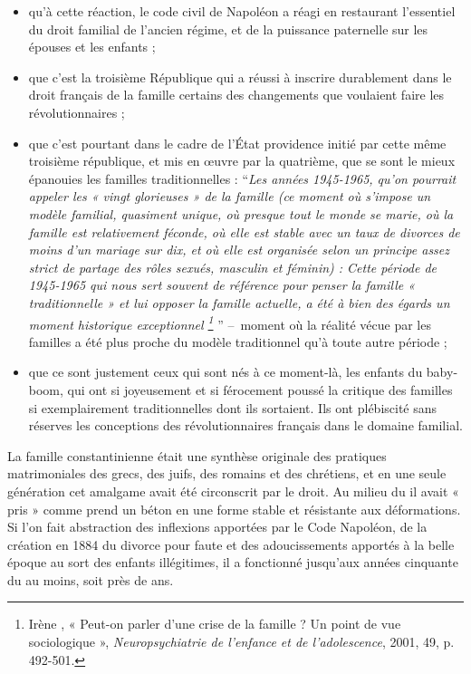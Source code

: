 \begin{itemize}
\item qu'à cette réaction, le code civil de Napoléon a réagi en restaurant l'essentiel du droit familial de l'ancien régime, et de la puissance paternelle sur les épouses et les enfants ;
 
\item que c'est la troisième République qui a réussi à inscrire durablement dans le droit français de la famille certains des changements que voulaient faire les révolutionnaires ;
 
\item que c'est pourtant dans le cadre de l'État providence initié par cette même troisième république, et mis en œuvre par la quatrième, que se sont le mieux épanouies les familles traditionnelles : \enquote{\emph{Les années 1945-1965, qu'on pourrait appeler les « vingt glorieuses » de la famille (ce moment où s'impose un modèle familial, quasiment unique, où presque tout le monde se marie, où la famille est relativement féconde, où elle est stable avec un taux de divorces de moins d'un mariage sur dix, et où elle est organisée selon un principe assez strict de partage des rôles sexués, masculin et féminin) : Cette période de 1945-1965 qui nous sert souvent de référence pour penser la famille « traditionnelle » et lui opposer la famille actuelle, a été à bien des égards un moment historique exceptionnel%
\footnote{Irène , « Peut-on parler d'une crise de la famille ? Un point de vue sociologique », \emph{Neuropsychiatrie de l'enfance et de l'adolescence}, 2001, 49, p. 492-501.}%
}} \mbox{-- }moment où la réalité vécue par les familles a été plus proche du modèle traditionnel qu'à toute autre période ;

\item que ce sont justement ceux qui sont nés à ce moment-là, les enfants du baby-boom, qui ont si joyeusement et si férocement poussé la critique des familles si exemplairement traditionnelles dont ils sortaient. Ils ont plébiscité sans réserves les conceptions des révolutionnaires français dans le domaine familial.
 
\end{itemize}
 
 La famille constantinienne était une synthèse originale des pratiques matrimoniales des grecs, des juifs, des romains et des chrétiens, et en une seule génération cet amalgame avait été circonscrit par le droit. Au milieu du  il avait « pris » comme prend un béton en une forme stable et résistante aux déformations.  Si l'on fait abstraction des inflexions apportées par le Code Napoléon, de la création en 1884 du divorce pour faute et des adoucissements apportés à la belle époque au sort des enfants illégitimes, il a fonctionné jusqu'aux années cinquante du  au moins, soit près de  ans. 
 
